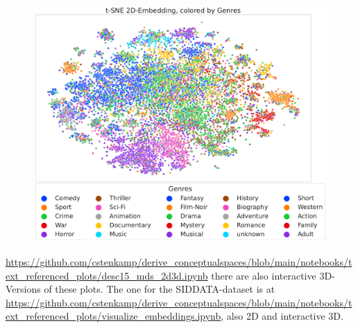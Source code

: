 \begin{figure}[h]
	\begin{center}
	  \includegraphics[width=\textwidth]{graphics/figures/scatter_mds_tsne_movies_Genres.pdf}
	  \label{fig:scatter_mds_movies}
	\end{center}
\end{figure}


 \url{https://github.com/cstenkamp/derive_conceptualspaces/blob/main/notebooks/text_referenced_plots/desc15_mds_2d3d.ipynb} there are also interactive 3D-Versions of these plots. The one for the SIDDATA-dataset is at \url{https://github.com/cstenkamp/derive_conceptualspaces/blob/main/notebooks/text_referenced_plots/visualize_embeddings.ipynb}, also 2D and interactive 3D. 